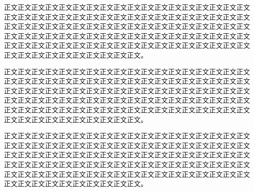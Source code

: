 \begin{cnabstract}
正文正文正文正文正文正文正文正文正文正文正文正文正文正文正文正文正文正文正文正文正文正文正文正文正文正文正文正文正文正文正文正文正文正文正文正文正文正文正文正文正文正文正文正文正文正文正文正文正文正文正文正文正文正文正文正文正文正文正文正文正文正文正文正文正文正文正文正文正文正文正文正文正文正文正文正文正文正文正文正文正文正文正文正文正文正文正文正文正文正文正文正文正文正文正文正文正文正文正文正文。

正文正文正文正文正文正文正文正文正文正文正文正文正文正文正文正文正文正文正文正文正文正文正文正文正文正文正文正文正文正文正文正文正文正文正文正文正文正文正文正文正文正文正文正文正文正文正文正文正文正文正文正文正文正文正文正文正文正文正文正文正文正文正文正文正文正文正文正文正文正文正文正文正文正文正文正文正文正文正文正文正文正文正文正文正文正文正文正文正文正文正文正文正文正文正文正文正文正文正文正文。

正文正文正文正文正文正文正文正文正文正文正文正文正文正文正文正文正文正文正文正文正文正文正文正文正文正文正文正文正文正文正文正文正文正文正文正文正文正文正文正文正文正文正文正文正文正文正文正文正文正文正文正文正文正文正文正文正文正文正文正文正文正文正文正文正文正文正文正文正文正文正文正文正文正文正文正文正文正文正文正文正文正文正文正文正文正文正文正文正文正文正文正文正文正文正文正文正文正文正文正文。

\end{cnabstract}
